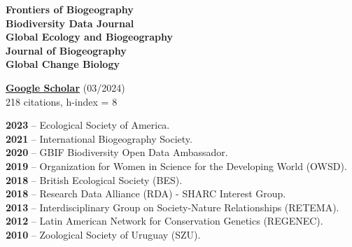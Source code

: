 \documentclass[9pt]{developercv} %
\begin{document}

\begin{minipage}[t]{0.35\textwidth}
	\vspace{-\baselineskip} %
	
	\textbf{Frontiers of Biogeography}\\
	\textbf{Biodiversity Data Journal}\\
	\textbf{Global Ecology and Biogeography}\\
	\textbf{Journal of Biogeography}\\
	\textbf{Global Change Biology}


	\textbf{\href{https://scholar.google.com/citations?user=9KCM81IAAAAJ&hl}{Google Scholar}} (03/2024)\\
	218 citations, h-index = 8\\
\end{minipage} 
\hfill
\begin{minipage}[t]{0.65\textwidth}
	\vspace{-\baselineskip} %


	\textbf{2023} -- Ecological Society of America.\\
	\textbf{2021} -- International Biogeography Society.\\
	\textbf{2020} -- GBIF Biodiversity Open Data Ambassador.\\
	\textbf{2019} -- Organization for Women in Science for the Developing World (OWSD).\\
	\textbf{2018} -- British Ecological Society (BES).\\ 
	\textbf{2018} -- Research Data Alliance (RDA) - SHARC Interest Group.\\ 
	\textbf{2013} -- Interdisciplinary Group on Society-Nature Relationships (RETEMA).\\
	\textbf{2012} -- Latin American Network for Conservation Genetics (REGENEC).\\
	\textbf{2010} -- Zoological Society of Uruguay (SZU).\\\\
	
\end{minipage} 
\end{document}
